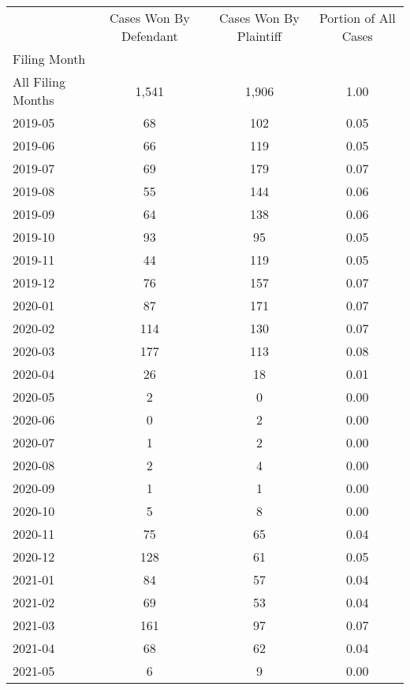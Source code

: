 \begin{tabular}{lccc}
\toprule
 & Cases Won By Defendant & Cases Won By Plaintiff & Portion of All Cases \\
Filing Month &  &  &  \\
\midrule
All Filing Months & 1,541 & 1,906 & 1.00 \\
2019-05 & 68 & 102 & 0.05 \\
2019-06 & 66 & 119 & 0.05 \\
2019-07 & 69 & 179 & 0.07 \\
2019-08 & 55 & 144 & 0.06 \\
2019-09 & 64 & 138 & 0.06 \\
2019-10 & 93 & 95 & 0.05 \\
2019-11 & 44 & 119 & 0.05 \\
2019-12 & 76 & 157 & 0.07 \\
2020-01 & 87 & 171 & 0.07 \\
2020-02 & 114 & 130 & 0.07 \\
2020-03 & 177 & 113 & 0.08 \\
2020-04 & 26 & 18 & 0.01 \\
2020-05 & 2 & 0 & 0.00 \\
2020-06 & 0 & 2 & 0.00 \\
2020-07 & 1 & 2 & 0.00 \\
2020-08 & 2 & 4 & 0.00 \\
2020-09 & 1 & 1 & 0.00 \\
2020-10 & 5 & 8 & 0.00 \\
2020-11 & 75 & 65 & 0.04 \\
2020-12 & 128 & 61 & 0.05 \\
2021-01 & 84 & 57 & 0.04 \\
2021-02 & 69 & 53 & 0.04 \\
2021-03 & 161 & 97 & 0.07 \\
2021-04 & 68 & 62 & 0.04 \\
2021-05 & 6 & 9 & 0.00 \\
\bottomrule
\end{tabular}
